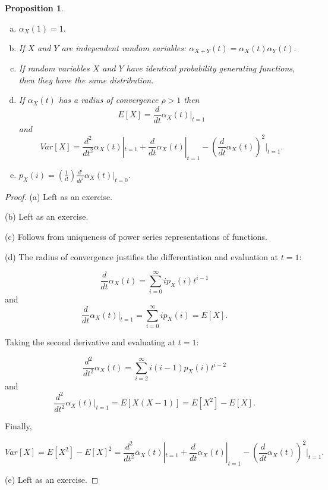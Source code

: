 \documentclass{book}
\theoremstyle{plain}%
\newtheorem{proposition}{Proposition}[section]
\theoremstyle{definition}
\begin{document}
\begin{proposition}
\text{ } \newline
\begin{enumerate}[(a)]
\item $\alpha_X(1) = 1.$
\item If $X$ and $Y$ are independent random variables: $\alpha_{X+Y}(t) = \alpha_{X}(t)\alpha_{Y}(t).$
\item If random variables $X$ and $Y$ have identical probability generating functions, then they have the same distribution.
\item If $\alpha_X(t)$ has a radius of convergence $\rho > 1$ then $$E[X] = \frac{d}{dt}\alpha_X(t)|_{t=1}$$ and $$Var[X] = \frac{d^2}{dt^2}\alpha_X(t)|_{t=1} + \frac{d}{dt}\alpha_X(t)|_{t=1} - (\frac{d}{dt}\alpha_X(t))^2|_{t=1}.$$
\item $p_X(i) = \left(\frac{1}{i!}\right)\frac{d^i}{dt^i}\alpha_X(t)|_{t=0}$.\end{enumerate}\label{prop:pgf}
\end{proposition}

\begin{proof}
(a) Left as an exercise.

(b) Left as an exercise.

(c) Follows from uniqueness of power series representations of functions.

(d) The radius of convergence justifies the differentiation and evaluation at $t=1$:

$$\frac{d}{dt}\alpha_X(t) = \sum_{i=0}^\infty ip_X(i)t^{i-1}$$ and $$\frac{d}{dt}\alpha_X(t)|_{t=1}=\sum_{i=0}^\infty i p_X(i) = E[X].$$

Taking the second derivative and evaluating at $t=1$:

$$\frac{d^2}{dt^2}\alpha_X(t) = \sum_{i=2}^\infty i(i-1)p_X(i)t^{i-2}$$ and $$\frac{d^2}{dt^2}\alpha_X(t)|_{t=1} = E[X(X-1)] = E[X^2] - E[X].$$

Finally,

$$Var[X] = E[X^2] - E[X]^2 = \frac{d^2}{dt^2}\alpha_X(t)|_{t=1} + \frac{d}{dt}\alpha_X(t)|_{t=1} - (\frac{d}{dt}\alpha_X(t))^2|_{t=1}.$$

(e) Left as an exercise.
\end{proof}
\end{document}

